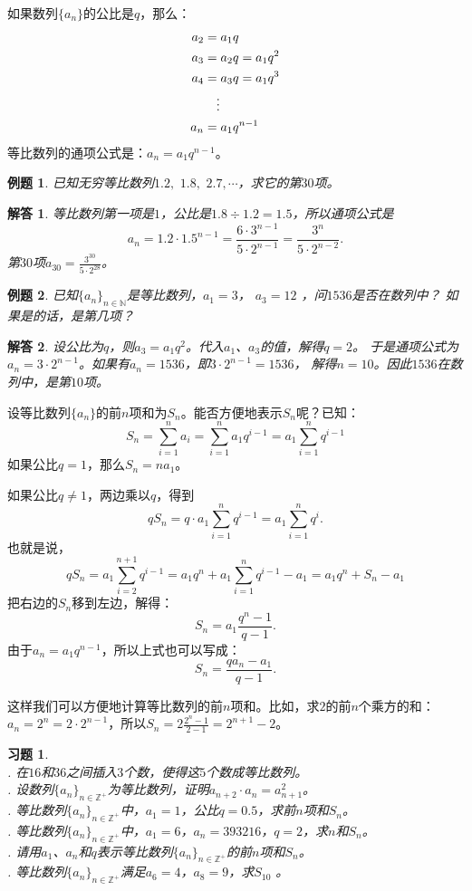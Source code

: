 \documentclass[12pt,UTF8]{ctexbook}
\newtheorem{et}{例题}[section]
\newtheorem*{so}{解答}
\newtheorem{xt}{习题}[section]
\begin{document}
如果数列$\{a_n\}$的公比是$q$，那么：
\begin{align}
a_2 &= a_1 q  \notag \\
a_3 &= a_2 q = a_1 q^2 \notag \\
a_4 &= a_3 q = a_1 q^3 \notag \\
&\quad \vdots \notag \\
a_n &= a_1 q^{n-1} \notag 
\end{align}
等比数列的通项公式是：$a_n = a_1 q^{n-1}$。
\begin{et}
    已知无穷等比数列$1.2, \,\,1.8,\,\,2.7, \cdots$，求它的第$30$项。    
\end{et}
\begin{so}
等比数列第一项是$1$，公比是$1.8\div1.2=1.5$，所以通项公式是
$$a_n = 1.2 \cdot 1.5^{n-1} = \frac{6\cdot3^{n-1}}{5\cdot2^{n-1}} = \frac{3^n}{5\cdot 2^{n-2}}.$$
第$30$项$a_{30} = \frac{3^{30}}{5\cdot 2^{28}}$。
\end{so}
\begin{et}
    已知$\{a_n\}_{n\in\mathbb{N}}$是等比数列，$a_1 = 3$， $a_3 = 12$ ，问$1536$是否在数列中？
    如果是的话，是第几项？    
\end{et}
\begin{so}
    设公比为$q$，则$a_3 = a_1 q^2$。代入$a_1$、$a_3$的值，解得$q = 2$。
    于是通项公式为$a_n = 3\cdot 2^{n-1}$。如果有$a_n = 1536$，即$3\cdot2^{n-1}=1536$，
    解得$n = 10$。因此$1536$在数列中，是第$10$项。    
\end{so}

设等比数列$\{a_n\}$的前$n$项和为$S_n$。能否方便地表示$S_n$呢？已知：
$$ S_n = \sum_{i=1}^n a_i = \sum_{i=1}^n a_1 q^{i-1} = a_1 \sum_{i=1}^n q^{i-1} $$
如果公比$q = 1$，那么$S_n = na_1$。

如果公比$q \neq 1$，两边乘以$q$，得到
$$ q S_n = q \cdot a_1 \sum_{i=1}^n q^{i-1} = a_1 \sum_{i=1}^n q^{i}.$$
也就是说，
$$ qS_n = a_1 \sum_{i=2}^{n+1} q^{i-1} = a_1 q^n + a_1 \sum_{i=1}^{n} q^{i-1} - a_1  = a_1 q^n + S_{n} - a_1$$
把右边的$S_n$移到左边，解得：
$$ S_n = a_1\frac{q^n - 1}{q - 1}. $$
由于$a_n = a_1q^{n-1}$，所以上式也可以写成：
$$ S_n = \frac{q a_n - a_1}{q - 1}. $$

这样我们可以方便地计算等比数列的前$n$项和。比如，求$2$的前$n$个乘方的和：$a_n = 2^{n} = 2\cdot 2^{n-1}$，所以$S_n =2\frac{2^{n}-1}{2-1} = 2^{n+1} - 2$。
\begin{xt}
    \mbox{} \\
    . 在$16$和$36$之间插入$3$个数，使得这$5$个数成等比数列。 \\
    . 设数列$\{a_n\}_{n\in\mathbb{Z}^+}$为等比数列，证明$a_{n+2} \cdot a_n = a_{n+1}^2$。 \\
    . 等比数列$\{a_n\}_{n\in\mathbb{Z}^+}$中，$a_1 = 1$，公比$q = 0.5$，求前$n$项和$S_n$。 \\
    . 等比数列$\{a_n\}_{n\in\mathbb{Z}^+}$中，$a_1 = 6$，$a_n = 393216$，$q = 2$，求$n$和$S_n$。 \\
    . 请用$a_1$、$a_n$和$q$表示等比数列$\{a_n\}_{n\in\mathbb{Z}^+}$的前$n$项和$S_n$。 \\
    . 等比数列$\{a_n\}_{n\in\mathbb{Z}^+}$满足$a_6 = 4$，$a_{8}=9$，求$S_{10}$ 。
\end{xt}
\end{document}
